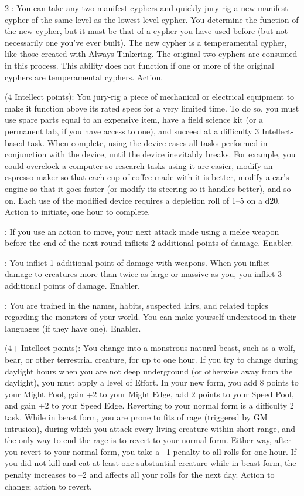 \begin{multicols}{2}
: You can take any two manifest cyphers and quickly jury-rig a new manifest cypher of the same level as the lowest-level cypher. You determine the function of the new cypher, but it must be that of a cypher you have used before (but not necessarily one you’ve ever built). The new cypher is a temperamental cypher, like those created with Always Tinkering. The original two cyphers are consumed in this process. This ability does not function if one or more of the original cyphers are temperamental cyphers. Action.

 (4 Intellect points): You jury-rig a piece of mechanical or electrical equipment to make it function above its rated specs for a very limited time. To do so, you must use spare parts equal to an expensive item, have a field science kit (or a permanent lab, if you have access to one), and succeed at a difficulty 3 Intellect-based task. When complete, using the device eases all tasks performed in conjunction with the device, until the device inevitably breaks. For example, you could overclock a computer so research tasks using it are easier, modify an espresso maker so that each cup of coffee made with it is better, modify a car’s engine so that it goes faster (or modify its steering so it handles better), and so on. Each use of the modified device requires a depletion roll of 1–5 on a d20. Action to initiate, one hour to complete.
 
: If you use an action to move, your next attack made using a melee weapon before the end of the next round inflicts 2 additional points of damage. Enabler. 
 
: You inflict 1 additional point of damage with weapons. When you inflict damage to creatures more than twice as large or massive as you, you inflict 3 additional points of damage. Enabler. 
 
: You are trained in the names, habits, suspected lairs, and related topics regarding the monsters of your world. You can make yourself understood in their languages (if they have one). Enabler. 
 
 (4+ Intellect points): You change into a monstrous natural beast, such as a wolf, bear, or other terrestrial creature, for up to one hour. If you try to change during daylight hours when you are not deep underground (or otherwise away from the daylight), you must apply a level of Effort. In your new form, you add 8 points to your Might Pool, gain +2 to your Might Edge, add 2 points to your Speed Pool, and gain +2 to your Speed Edge. Reverting to your normal form is a difficulty 2 task. While in beast form, you are prone to fits of rage (triggered by GM intrusion), during which you attack every living creature within short range, and the only way to end the rage is to revert to your normal form. Either way, after you revert to your normal form, you take a –1 penalty to all rolls for one hour. If you did not kill and eat at least one substantial creature while in beast form, the penalty increases to –2 and affects all your rolls for the next day. Action to change; action to revert.
 

\end{multicols}
